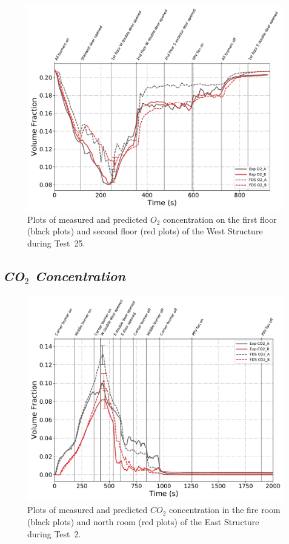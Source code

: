 \begin{figure}[!h]
	\centering
	\includegraphics[width=\columnwidth]{Figures/Plots/Validation/Gas_Concentration/Test_25_O2}
	\caption[Plots of measured and predicted $O_2$ concentration during Test~25.]{Plots of measured and predicted $O_2$ concentration on the first floor (black plots) and second floor (red plots) of the West Structure during Test~25.}
	\label{fig:Test25_O2}
\end{figure}

\clearpage
\subsection*{\textit{CO$_2$ Concentration}}
\begin{figure}[!h]
	\centering
	\includegraphics[width=\columnwidth]{Figures/Plots/Validation/Gas_Concentration/Test_2_CO2}
	\caption[Plots of measured and predicted $CO_2$ concentration during Test~2.]{Plots of measured and predicted $CO_2$ concentration in the fire room (black plots) and north room (red plots) of the East Structure during Test~2.}
	\label{fig:Test2_CO2}
\end{figure}

